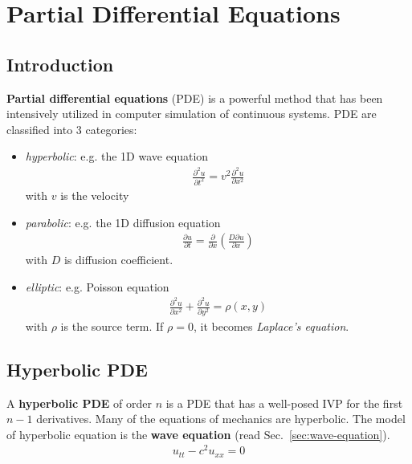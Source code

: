 
\chapter{Partial Differential Equations}
\label{chap:part-diff-equat}

\section{Introduction}
\label{sec:introduction-9}

{\bf Partial differential equations} (PDE) is a powerful method that
has been intensively utilized in computer simulation of continuous
systems. PDE are classified into 3 categories:
\begin{itemize}
\item {\it hyperbolic}: e.g. the 1D wave equation
  \begin{eqnarray}
    \label{eq:13}
    \frac{\partial^2 u}{\partial t^2} = v^2
    \frac{\partial^2u}{\partial x^2}
  \end{eqnarray}
with $v$ is the velocity
\item {\it parabolic}: e.g. the 1D diffusion equation
  \begin{eqnarray}
    \label{eq:14}
    \frac{\partial u}{\partial t} = \frac{\partial}{\partial x}\left(
    \frac{D\partial u}{\partial x}\right)
  \end{eqnarray}
with $D$ is diffusion coefficient. 
\item {\it elliptic}: e.g. Poisson equation
  \begin{eqnarray}
    \label{eq:15}
    \frac{\partial^2 u}{\partial x^2} + \frac{\partial^2 u}{\partial
      y^2}=  \rho(x,y)
  \end{eqnarray}
with $\rho$ is the source term. If $\rho=0$, it becomes {\it Laplace's
  equation}. 
\end{itemize}

\section{Hyperbolic PDE}
\label{sec:hyperbolic-pde}

A {\bf hyperbolic PDE} of order $n$ is a PDE that has a well-posed IVP
for the first $n-1$ derivatives. Many of the equations of mechanics
are hyperbolic. The model of hyperbolic equation is the
{\bf wave equation} (read Sec.~\ref{sec:wave-equation}). 
\begin{eqnarray*}
  u_{tt}-c^2u_{xx} = 0
\end{eqnarray*}

